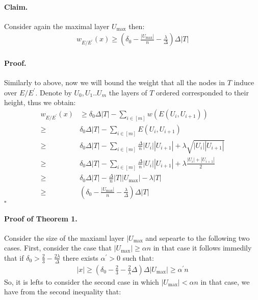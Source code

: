 \documentclass{article}
\begin{document}
\begin{multicols*}{2}
  \paragraph{Claim.} Consider again the maximal layer $U_{\max}$ then: 
  \begin{equation*}
    \begin{split}
      w_{E/E^{\prime}}\left( x \right) \ge \left( \delta_{0} - \frac{|U_{\max}|}{n} - \frac{\lambda}{\Delta} \right) \Delta|T| 
    \end{split}
  \end{equation*}
  \paragraph{Proof.} Similarly to above, now we will bound the weight that all the nodes in $T$ induce over $E/E^{\prime}$. Denote by $U_{0}, U_{1} .. U_{m}$ the layers of $T$ ordered corresponded to their height, thus we obtain: 
  \begin{equation*}
    \begin{split}
      w_{E/E^{\prime}}\left( x \right) & \ge \delta_{0}\Delta|T| - \sum_{i\in [m]}{ w \left( E\left( U_{i}, U_{i+1}  \right) \right)  } \\ 
      \ge & \delta_{0}\Delta|T|  - \sum_{i \in [m]}{ E\left( U_{i}, U_{i+1}  \right)  } \\ 
      \ge & \delta_{0}\Delta|T|  -  \sum_{i \in [m]}{ \frac{\Delta}{n}|U_{i}| |U_{i+1}| + \lambda \sqrt{ |U_{i}| |U_{i+1}|} }\\ 
      \ge & \delta_{0}\Delta|T|  -  \sum_{i \in [m]}{ \frac{\Delta}{n}|U_{i}| |U_{i+1}| + \lambda \frac{ |U_{i}|+ |U_{i+1}|}{2 } }\\ 
      \ge & \delta_{0}\Delta|T|  - \frac{\Delta}{n}|T||U_{\max}| -  \lambda |T| \\ 
      \ge & \left( \delta_{0} - \frac{|U_{\max}| }{n}-  \frac{\lambda}{\Delta} \right) \Delta|T| 
    \end{split}
  \end{equation*}
  $\square$
  \paragraph{Proof of Theorem 1.} Consider the size of the maxiaml layer $|U_{\max}$ and sepearte to the following two cases. First, consider the case that $|U_{\max}| \ge  \alpha n $ in that case it follows immedily that if $\delta_{0} > \frac{2}{3} - \frac{2\lambda}{\Delta}$ there exists $\alpha^{\prime} > 0 $ such that:  
  \begin{equation*}
    \begin{split}
      |x| \ge \left( \delta_{0} - \frac{2}{3} - \frac{2}{\lambda}\Delta \right)\Delta|U_{\max}| \ge  \alpha^{\prime} n 
    \end{split}
  \end{equation*}
  So, it is lefts to consider the second case in which $ |U_{\max}| < \alpha n $ in that case, we have from the second inequality that: 


\end{multicols*}
\end{document}
